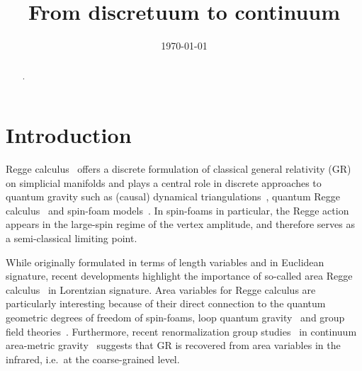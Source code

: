 \documentclass[amsmath,amssymb,aps,twocolumn,superscriptaddress,nofootinbib]{revtex4-1}
\begin{document}
\title{From discretuum to continuum}


\date{\today}

\begin{abstract}
{
.
}
\end{abstract}

\maketitle

\section{Introduction}

Regge calculus~\cite{Regge:1961ct} offers a discrete formulation of classical general relativity (GR) on simplicial manifolds and plays a central role in discrete approaches to quantum gravity such as (causal) dynamical triangulations~\cite{Loll:2019rdj,Ambjorn:2012jv}, quantum Regge calculus~\cite{Williams2009,Hamber2009} and spin-foam models~\cite{Perez:2012wv}. 
In spin-foams in particular, the Regge action appears in the large-spin regime of the vertex amplitude, and therefore serves as a semi-classical limiting point.

While originally formulated in terms of length variables and in Euclidean signature, recent developments highlight the importance of so-called area Regge calculus~\cite{Asante:2018wqy,Barrett:1997tx} in Lorentzian signature.
Area variables for Regge calculus are particularly interesting because of their direct connection to the quantum geometric degrees of freedom of spin-foams, loop quantum gravity~\cite{Rovelli:2004tv,Thiemann2007a} and group field theories~\cite{Freidel:2005jy,Oriti:2012wt}.
Furthermore, recent renormalization group studies~\cite{Borissova:2025frj} in continuum area-metric gravity~\cite{Schuller:2005yt,Borissova:2022clg,Borissova:2023yxs} suggests that GR is recovered from area variables in the infrared, i.e.~at the coarse-grained level.
\end{document}
